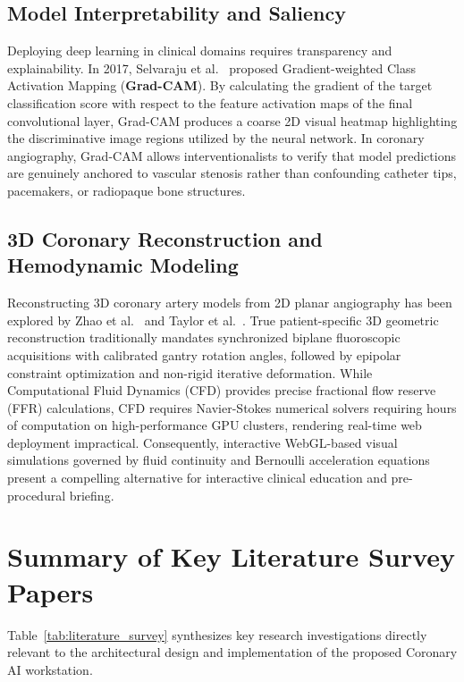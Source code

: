 \subsection{Model Interpretability and Saliency}
Deploying deep learning in clinical domains requires transparency and explainability. In 2017, Selvaraju et al.~\cite{selvaraju2017gradcam} proposed Gradient-weighted Class Activation Mapping (\textbf{Grad-CAM}). By calculating the gradient of the target classification score with respect to the feature activation maps of the final convolutional layer, Grad-CAM produces a coarse 2D visual heatmap highlighting the discriminative image regions utilized by the neural network. In coronary angiography, Grad-CAM allows interventionalists to verify that model predictions are genuinely anchored to vascular stenosis rather than confounding catheter tips, pacemakers, or radiopaque bone structures.

\subsection{3D Coronary Reconstruction and Hemodynamic Modeling}
Reconstructing 3D coronary artery models from 2D planar angiography has been explored by Zhao et al.~\cite{zhao2021coronary} and Taylor et al.~\cite{taylor2013computational}. True patient-specific 3D geometric reconstruction traditionally mandates synchronized biplane fluoroscopic acquisitions with calibrated gantry rotation angles, followed by epipolar constraint optimization and non-rigid iterative deformation. While Computational Fluid Dynamics (CFD) provides precise fractional flow reserve (FFR) calculations, CFD requires Navier-Stokes numerical solvers requiring hours of computation on high-performance GPU clusters, rendering real-time web deployment impractical. Consequently, interactive WebGL-based visual simulations governed by fluid continuity and Bernoulli acceleration equations present a compelling alternative for interactive clinical education and pre-procedural briefing.

\section{Summary of Key Literature Survey Papers}
Table~\ref{tab:literature_survey} synthesizes key research investigations directly relevant to the architectural design and implementation of the proposed Coronary AI workstation.

